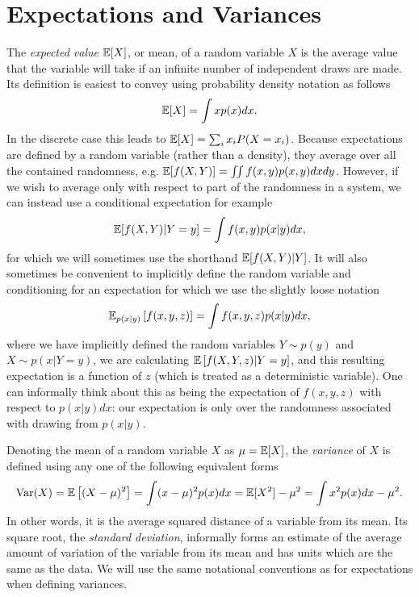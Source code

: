 \section{Expectations and Variances}
\label{sec:prob:expt}

The \emph{expected value} $\mathbb{E} [X]$, or mean, of a random variable $X$ is the average value that the variable
will take if an infinite number of independent draws are made.  Its definition is easiest to convey using 
probability density notation as follows
\begin{align}
\label{eq:prob:expt}
\mathbb{E} [X] = \int x p(x)dx.
\end{align}
In the discrete case this leads to $\mathbb{E} [X] = \sum_{i} x_i P(X=x_i)$.  Because expectations are defined by a random
variable (rather than a density), they
average over all the contained randomness, e.g. $\mathbb{E} [f(X,Y)]=\iint f(x,y) p(x,y)dxdy$.  However, if we
wish to average only with respect to part of the randomness in a system, we can instead use a conditional
expectation for example
\begin{align}
\label{eq:prob:cond-expt}
\mathbb{E} [f(X,Y) | Y=y] = \int f(x,y) p(x|y) dx,
\end{align}
for which we will sometimes use the shorthand $\mathbb{E} [f(X,Y) | Y]$.
It will also sometimes be convenient to implicitly define the random variable and conditioning for an 
expectation for which we use the slightly loose notation
\begin{align}
\label{eq:prob:expt-2}
\mathbb{E}_{p(x|y)} \left[f(x,y,z)\right] = \int f(x,y,z) p(x|y) dx,
\end{align}
where we have implicitly defined the random variables $Y \sim p(y)$ and $X \sim p(x | Y=y)$,
we are calculating $\mathbb{E} \left[f(X,Y,z) | Y=y\right]$,
and this resulting expectation is a function of $z$ (which is treated as a deterministic variable).  
One can informally think about this
as being the expectation of $f(x,y,z)$ with respect to $p(x|y)dx$:
our expectation is only over the randomness associated with drawing from $p(x|y)$.  

Denoting the mean of a random variable $X$ as $\mu=\mathbb{E} [X]$, the \emph{variance} of $X$
is defined using any one of the following equivalent forms
\begin{align}
\mathrm{Var} (X) = \mathbb{E} \left[(X-\mu)^2\right] = \int (x-\mu)^2 p(x)dx = \mathbb{E} [X^2] - \mu^2 =
\int x^2 p(x) dx - \mu^2.
\end{align}
In other words, it is the average squared distance of a variable from its mean.
Its square root, the \emph{standard deviation}, informally forms an estimate of the average
amount of variation of the variable from its mean and has units which are the same
as the data.  We will use the same notational conventions as for expectations when defining
variances.

